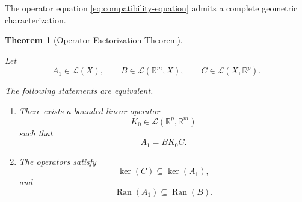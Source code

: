 \documentclass[pdflatex,sn-mathphys-num]{sn-jnl}
\theoremstyle{thmstyleone}%
\newtheorem{theorem}{Theorem}%
\theoremstyle{thmstyletwo}%
\theoremstyle{thmstylethree}%
\begin{document}
The operator equation \eqref{eq:compatibility-equation} admits a complete geometric characterization.

\begin{theorem}[Operator Factorization Theorem]
\label{thm:operator-factorization}

Let
\[
A_{1}\in\mathcal L(X),
\qquad
B\in\mathcal L(\mathbb R^{m},X),
\qquad
C\in\mathcal L(X,\mathbb R^{p}).
\]

The following statements are equivalent.

\begin{enumerate}

\item[(i)]
There exists a bounded linear operator
\[
K_{0}\in\mathcal L(\mathbb R^{p},\mathbb R^{m})
\]
such that
\[
A_{1}=BK_{0}C.
\]

\item[(ii)]
The operators satisfy
\begin{equation}
\ker(C)\subseteq\ker(A_{1}),
\label{eq:kernel-condition}
\end{equation}
and
\begin{equation}
\operatorname{Ran}(A_{1})
\subseteq
\operatorname{Ran}(B).
\label{eq:range-condition}
\end{equation}

\end{enumerate}

\end{theorem}
\end{document}
